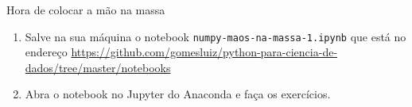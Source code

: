 \begin{frame}[t, fragile]{Hora de colocar a mão na massa}
  \begin{enumerate}
  \item Salve na sua máquina o notebook \verb!numpy-maos-na-massa-1.ipynb! que está no endereço \url{https://github.com/gomesluiz/python-para-ciencia-de-dados/tree/master/notebooks}
  \item Abra o notebook no Jupyter do Anaconda e faça os exercícios.
  \end{enumerate}
\end{frame}